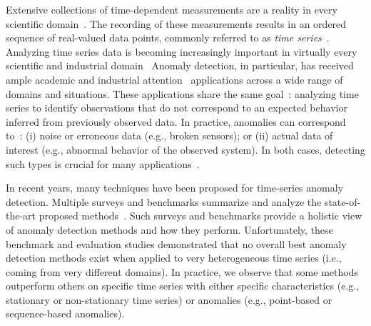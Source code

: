 Extensive collections of time-dependent measurements are a reality in every scientific domain~\cite{Palpanas2015,DBLP:journals/dagstuhl-reports/BagnallCPZ19,Palpanas2019,paparrizos2021vergedb,liu2023amir,paparrizos2018fastthesis}. The recording of these measurements results in an ordered sequence of real-valued data points, commonly referred to as {\em time series}~\cite{paparrizos2015k,paparrizos2017fast,bariya2021k,paparrizos2022fast,paparrizos2023accelerating}. Analyzing time series data is becoming increasingly important in virtually every scientific and industrial domain~\cite{DBLP:conf/edbt/EchihabiZP21,DBLP:journals/pvldb/EchihabiPZ21,liu2021decomposed,jiang2020pids,jiang2021good,dziedzic2019band,paparrizos2019grail,paparrizos2020debunking,paparrizos2016detecting,paparrizos2016screening,mckeown2016predicting,goel2016social,DBLP:journals/pvldb/0003WNP22,DBLP:conf/eenergy/PetraliaCBP23} Anomaly detection, in particular, has received ample academic and industrial attention~\cite{page1957problems,fox1972outliers} applications across a wide range of domains and situations. These applications share the same goal~\cite{statisticaloutliers,DBLP:conf/vldb/SubramaniamPPKG06,DBLP:conf/icdm/YehZUBDDSMK16}: analyzing time series to identify observations that do not correspond to an expected behavior inferred from previously observed data. In practice, anomalies can correspond to~\cite{aggarwal2017introduction}: (i) noise or erroneous data (e.g., broken sensors); or (ii) actual data of interest (e.g., abnormal behavior of the observed system). In both cases, detecting such types is crucial for many applications~\cite{IMSGroundtruth,DBLP:conf/healthcom/HadjemNK16}.

In recent years, many techniques have been proposed for time-series anomaly detection. Multiple surveys and benchmarks summarize and analyze the state-of-the-art proposed methods~\cite{blazquez2021review,10.14778/3529337.3529354,10.14778/3538598.3538602,10.14778/3551793.3551830,10.14778/3476249.3476307,wu2020current,7424283,jacob2020exathlon,Kim2021TowardsAR}. Such surveys and benchmarks provide a holistic view of anomaly detection methods and how they perform. Unfortunately, these benchmark and evaluation studies demonstrated that no overall best anomaly detection methods exist when applied to very heterogeneous time series (i.e., coming from very different domains). In practice, we observe that some methods outperform others on specific time series with either specific characteristics (e.g., stationary or non-stationary time series) or anomalies (e.g., point-based or sequence-based anomalies). 

